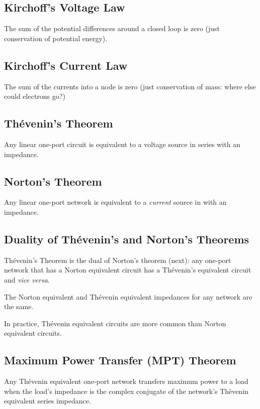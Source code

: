 \documentclass[11pt]{article}
\begin{document}
\subsection{Kirchoff's Voltage Law}

The sum of the potential differences around a closed loop is zero
(just conservation of potential energy).

\subsection{Kirchoff's Current Law}

The sum of the currents into a node is zero (just conservation of
mass: where else could electrons go?)

\subsection{Th\'evenin's Theorem}

Any linear one-port circuit is equivalent to a voltage source in
series with an impedance.

\subsection{Norton's Theorem}

Any linear one-port network is equivalent to a \emph{current} source
in  with an impedance.

\subsection{Duality of Th\'evenin's and Norton's Theorems}

Th\'evenin's Theorem is the dual of Norton's theorem (next): any
one-port network that has a Norton equivalent circuit has a
Th\'evenin's equivalent circuit and {\it vice versa}.

The Norton equivalent and Th\'evenin equivalent impedances for any
network are the same.

In practice, Th\'evenin equivalent circuits are more common than
Norton equivalent circuits.


\subsection{Maximum Power Transfer (MPT) Theorem}

Any Th\'evenin equivalent one-port network transfers maximum power to
a load when the load's impedance is the complex conjugate of the
network's Th\`evenin equivalent series impedance.
\end{document}
